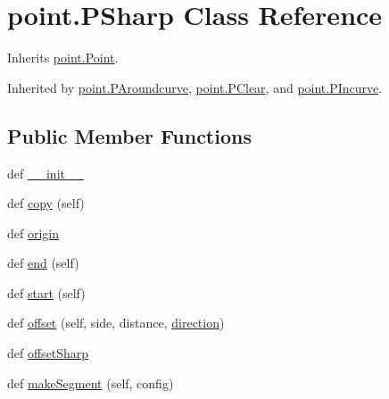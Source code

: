 \hypertarget{classpoint_1_1_p_sharp}{}\section{point.\+P\+Sharp Class Reference}
\label{classpoint_1_1_p_sharp}


Inherits \hyperlink{classpoint_1_1_point}{point.\+Point}.



Inherited by \hyperlink{classpoint_1_1_p_aroundcurve}{point.\+P\+Aroundcurve}, \hyperlink{classpoint_1_1_p_clear}{point.\+P\+Clear}, and \hyperlink{classpoint_1_1_p_incurve}{point.\+P\+Incurve}.

\subsection*{Public Member Functions}
\begin{DoxyCompactItemize}
\item 
def \hyperlink{classpoint_1_1_p_sharp_af1afffea36431e34b401c9309cc9ecdd}{\+\_\+\+\_\+init\+\_\+\+\_\+}
\item 
def \hyperlink{classpoint_1_1_p_sharp_afa05c02a7dd62f7a96c30de45a25a357}{copy} (self)
\item 
def \hyperlink{classpoint_1_1_p_sharp_a336940f711b57c174563dd7e98ea3be3}{origin}
\item 
def \hyperlink{classpoint_1_1_p_sharp_abd1c47a814f20256e037bc5169b2ac74}{end} (self)
\item 
def \hyperlink{classpoint_1_1_p_sharp_a31d9c83669e3e3f40fc139dd2652638e}{start} (self)
\item 
def \hyperlink{classpoint_1_1_p_sharp_a83811b734c116321893fa08cc8caaf68}{offset} (self, side, distance, \hyperlink{classpoint_1_1_p_sharp_a80d49050d431b2469e4052e0e85c05e7}{direction})
\item 
def \hyperlink{classpoint_1_1_p_sharp_a73d75efa18bb8f352a9dbd02efc59c9a}{offset\+Sharp}
\item 
def \hyperlink{classpoint_1_1_p_sharp_a8045adba8b185ad525d6d35aa2fee744}{make\+Segment} (self, config)
\end{DoxyCompactItemize}

